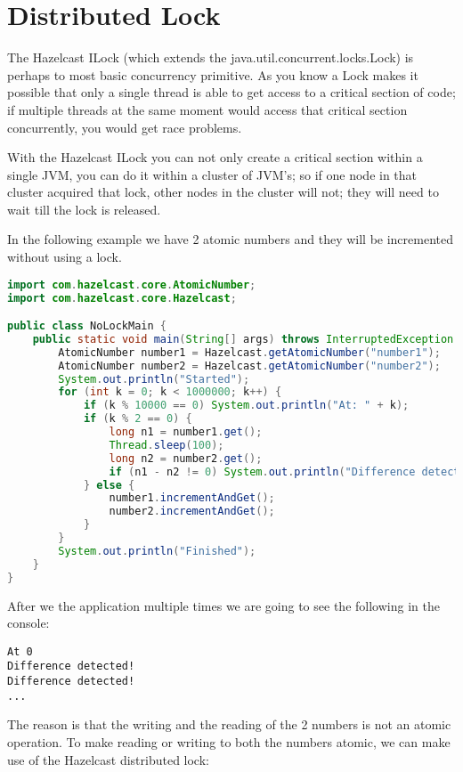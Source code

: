 \section{Distributed Lock}

The Hazelcast ILock (which extends the java.util.concurrent.locks.Lock) is perhaps to most basic concurrency primitive. As you know a Lock makes it possible that only a single thread is able to get access to a critical section of code; if multiple threads at the same moment would access that critical section concurrently, you would get race problems. 

With the Hazelcast ILock you can not only create a critical section within a single JVM, you can do it within a cluster of JVM's; so if one node in that cluster acquired that lock, other nodes in the cluster will not; they will need to wait till the lock is released.

In the following example we have 2 atomic numbers and they will be incremented without using a lock.
\begin{lstlisting}[language=java]
import com.hazelcast.core.AtomicNumber;
import com.hazelcast.core.Hazelcast;

public class NoLockMain {
    public static void main(String[] args) throws InterruptedException {
        AtomicNumber number1 = Hazelcast.getAtomicNumber("number1");
        AtomicNumber number2 = Hazelcast.getAtomicNumber("number2");
        System.out.println("Started");
        for (int k = 0; k < 1000000; k++) {
            if (k % 10000 == 0) System.out.println("At: " + k);
            if (k % 2 == 0) {
                long n1 = number1.get();
                Thread.sleep(100);
                long n2 = number2.get();
                if (n1 - n2 != 0) System.out.println("Difference detected!");
            } else {
                number1.incrementAndGet();
                number2.incrementAndGet();
            }
        }
        System.out.println("Finished");
    }
}
\end{lstlisting}

After we the application multiple times we are going to see the following in the console:
\begin{verbatim}
At 0
Difference detected!
Difference detected!
...
\end{verbatim}	

The reason is that the writing and the reading of the 2 numbers is not an atomic operation. To make reading or writing to both the numbers atomic, we can make use of the Hazelcast distributed lock:

